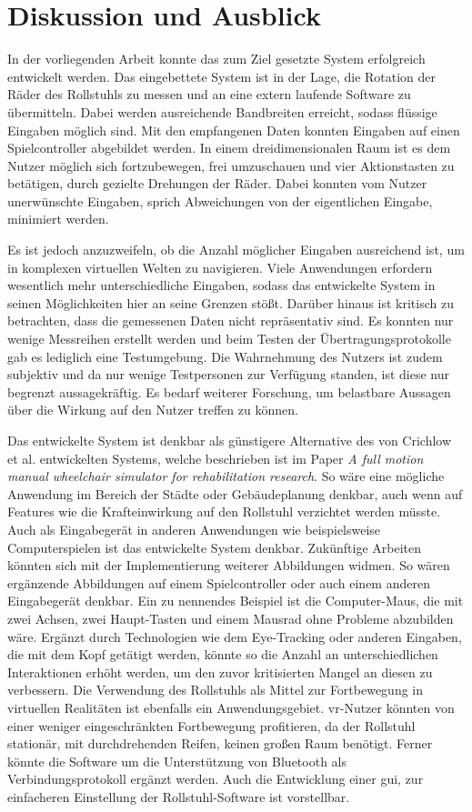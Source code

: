 \chapter{Diskussion und Ausblick}
In der vorliegenden Arbeit konnte das zum Ziel gesetzte System erfolgreich entwickelt werden.
Das eingebettete System ist in der Lage, die Rotation der Räder des Rollstuhls zu messen und an eine extern laufende Software zu übermitteln.
Dabei werden ausreichende Bandbreiten erreicht, sodass flüssige Eingaben möglich sind.
Mit den empfangenen Daten konnten Eingaben auf einen Spielcontroller abgebildet werden.
In einem dreidimensionalen Raum ist es dem Nutzer möglich sich fortzubewegen, frei umzuschauen und vier Aktionstasten zu betätigen, durch gezielte Drehungen der Räder.
Dabei konnten vom Nutzer unerwünschte Eingaben, sprich Abweichungen von der eigentlichen Eingabe, minimiert werden.

Es ist jedoch anzuzweifeln, ob die Anzahl möglicher Eingaben ausreichend ist, um in komplexen virtuellen Welten zu navigieren.
Viele Anwendungen erfordern wesentlich mehr unterschiedliche Eingaben, sodass das entwickelte System in seinen Möglichkeiten hier an seine Grenzen stößt.
Darüber hinaus ist kritisch zu betrachten, dass die gemessenen Daten nicht repräsentativ sind.
Es konnten nur wenige Messreihen erstellt werden und beim Testen der Übertragungsprotokolle gab es lediglich eine Testumgebung.
Die Wahrnehmung des Nutzers ist zudem subjektiv und da nur wenige Testpersonen zur Verfügung standen, ist diese nur begrenzt aussagekräftig.
Es bedarf weiterer Forschung, um belastbare Aussagen über die Wirkung auf den Nutzer treffen zu können.

Das entwickelte System ist denkbar als günstigere Alternative des von Crichlow et al. entwickelten Systems, welche beschrieben ist im Paper \textit{A full motion manual wheelchair simulator for rehabilitation research}\cite{crichlowFullMotionManual2011}.
So wäre eine mögliche Anwendung im Bereich der Städte oder Gebäudeplanung denkbar, auch wenn auf Features wie die Krafteinwirkung auf den Rollstuhl verzichtet werden müsste.
Auch als Eingabegerät in anderen Anwendungen wie beispielsweise Computerspielen ist das entwickelte System denkbar.
Zukünftige Arbeiten könnten sich mit der Implementierung weiterer Abbildungen widmen.
So wären ergänzende Abbildungen auf einem Spielcontroller oder auch einem anderen Eingabegerät denkbar.
Ein zu nennendes Beispiel ist die Computer-Maus, die mit zwei Achsen, zwei Haupt-Tasten und einem Mausrad ohne Probleme abzubilden wäre.
Ergänzt durch Technologien wie dem Eye-Tracking oder anderen Eingaben, die mit dem Kopf getätigt werden, könnte so die Anzahl an unterschiedlichen Interaktionen erhöht werden, um den zuvor kritisierten Mangel an diesen zu verbessern.
Die Verwendung des Rollstuhls als Mittel zur Fortbewegung in virtuellen Realitäten ist ebenfalls ein Anwendungsgebiet.
\ac{vr}-Nutzer könnten von einer weniger eingeschränkten Fortbewegung profitieren, da der Rollstuhl stationär, mit durchdrehenden Reifen, keinen großen Raum benötigt.
Ferner könnte die Software um die Unterstützung von Bluetooth als Verbindungsprotokoll ergänzt werden.
Auch die Entwicklung einer \ac{gui}, zur einfacheren Einstellung der Rollstuhl-Software ist vorstellbar.